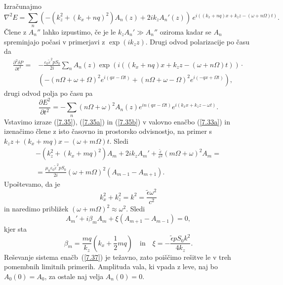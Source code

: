 Izračunajmo 
\begin{equation}
\nabla^{2}E=\sum_{n}\left( -(k_{z}^{2}+(k_{x}+nq)^{2})A_{n}(z)+2ik_{z}A_{n}'(z)\right) \, 
e^{i((k_x+nq)x+k_{z}z-(\omega+n\Omega)t)}.
\label{7.35}
\end{equation}
Člene z $A_{n}''$ lahko izpustimo, če je le $k_{z}A_{n}'\gg A_{n}''$ oziroma 
kadar se $A_{n}$ spreminjajo počasi v primerjavi z $\exp(ik_{z}z)$. Drugi odvod 
polarizacije po času da
\begin{equation}
\begin{split}
\frac{\partial^2 \delta P}{\partial t^2} =&-\frac{\varepsilon_0 \tilde{\varepsilon}^2pS_0}{2i} 
\sum_{n} A_n(z) \exp\left(i((k_x+nq)x+k_{z}z-(\omega+n\Omega)t)\right) \cdot \\ &\left(
-(n\Omega+\omega+\Omega)^2e^{i(qx-\Omega t)} + (n\Omega+\omega-\Omega)^2e^{i(-qx+\Omega t)} \right),
\label{7.35a}
\end{split}
\end{equation}
drugi odvod polja po času pa 
\begin{equation}
\frac{\partial E^{2}}{\partial t^{2}} = - \sum_{n}(n\Omega + \omega)^2 
A_{n}(z)e^{in(qx-\Omega t)}e^{i(k_{x}x+k_{z}z-\omega t)}.
\label{7.35b}
\end{equation}
Vstavimo izraze (\ref{7.35}), (\ref{7.35a}) in (\ref{7.35b}) v valovno enačbo (\ref{7.33a})
in izenačimo člene z isto časovno in prostorsko odvisnostjo, na primer
s $k_z z+(k_x+mq)x-(\omega+m\Omega)t$. Sledi
\begin{eqnarray}
-\left(k_{z}^{2}+(k_{x}+mq)^{2}\right)A_{m}+2ik_{z}A_{m}' + \frac{\tilde{\varepsilon}}{c^2}(m\Omega+\omega)^2A_m
=\\ =\frac{\mu_0\varepsilon_0\tilde{\varepsilon}^2pS_0}{2i}(\omega+m\Omega)^{2}(A_{m-1}-A_{m+1}).
\end{eqnarray}
Upoštevamo, da je 
\begin{equation} 
k_{x}^{2}+k_{z}^{2}=k^{2}=\frac{\tilde{\epsilon}\omega^2}{c^{2}}
\end{equation}
in naredimo približek $(\omega +m\Omega)^2 \approx \omega^2$.
Sledi
\begin{equation}
A_{m}'+i\beta_{m}A_{m}+\xi(A_{m+1}-A_{m-1})=0,
\label{7.37}
\end{equation}
kjer sta
\begin{equation}
\beta_{m}=\frac{mq}{k_{z}}(k_{x}+\frac{1}{2}mq) \quad \mathrm{in} \quad \xi=-\frac{\tilde{\epsilon} pS_0k^2}{4k_z}.
\label{7.38}
\end{equation}
Reševanje sistema enačb~(\ref{7.37}) je težavno, zato poiščimo rešitve le v treh
pomembnih limitnih primerih. Amplituda vala, ki vpada z leve, naj bo $A_{0}(0)=A_{0}$, 
za ostale naj velja $A_{n}(0)=0$.

